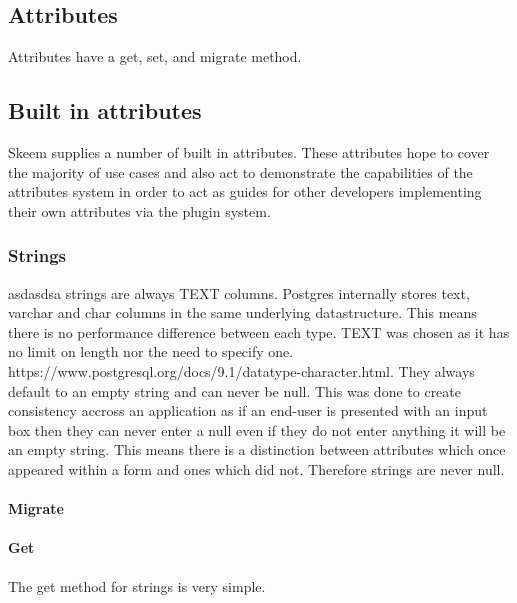 \documentclass[
  12pt,
]{article}
\let\oldparagraph\paragraph
\renewcommand{\paragraph}[1]{\oldparagraph{#1}\mbox{}}
\begin{document}
\hypertarget{attributes-2}{%
\subsection{Attributes}\label{attributes-2}}

Attributes have a get, set, and migrate method.

\hypertarget{built-in-attributes}{%
\subsection{Built in attributes}\label{built-in-attributes}}

Skeem supplies a number of built in attributes. These attributes hope to
cover the majority of use cases and also act to demonstrate the
capabilities of the attributes system in order to act as guides for
other developers implementing their own attributes via the plugin
system.

\hypertarget{strings-1}{%
\subsubsection{Strings}\label{strings-1}}

asdasdsa strings are always TEXT columns. Postgres internally stores
text, varchar and char columns in the same underlying datastructure.
This means there is no performance difference between each type. TEXT
was chosen as it has no limit on length nor the need to specify one.
https://www.postgresql.org/docs/9.1/datatype-character.html. They always
default to an empty string and can never be null. This was done to
create consistency accross an application as if an end-user is presented
with an input box then they can never enter a null even if they do not
enter anything it will be an empty string. This means there is a
distinction between attributes which once appeared within a form and
ones which did not. Therefore strings are never null.

\hypertarget{migrate}{%
\paragraph{Migrate}\label{migrate}}

\hypertarget{get}{%
\paragraph{Get}\label{get}}

The get method for strings is very simple.
\end{document}
